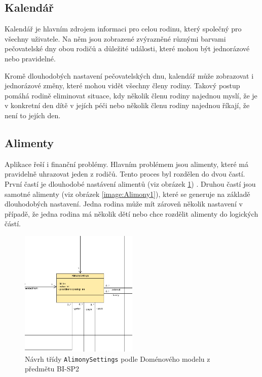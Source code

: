     \subsection{Kalendář}    
        Kalendář je hlavním zdrojem informaci pro celou rodinu, který společný pro všechny uživatele. Na něm jsou zobrazené zvýrazněné různými barvami pečovatelské dny obou rodičů a důležité události, které mohou být jednorázové nebo pravidelné. 
        
        Kromě dlouhodobých nastavení pečovatelských dnu, kalendář může zobrazovat i jednorázové změny, které mohou vidět všechny členy rodiny. Takový postup pomáhá rodině eliminovat situace, kdy několik členu rodiny najednou myslí, že je v konkretní den dítě v jejích péči nebo několik členu rodiny najednou říkají, že není to jejích den.  
    \subsection{Alimenty}    
        Aplikace řeší i finanční problémy. Hlavním problémem jsou alimenty, které má pravidelně uhrazovat jeden z rodičů. Tento proces byl rozdělen do dvou častí. První častí je dlouhodobé nastávení alimentů (viz obrázek \ref{image:AlimonySettings1}) . Druhou častí jsou samotné alimenty (viz obrázek \ref{image:Alimony1}), které se generuje na základě dlouhodobých nastavení. Jedna rodina může mít zároveň několik nastavení v případě, že jedna rodina má několik dětí nebo chce rozdělit alimenty do logických částí.
        \begin{figure}\centering
	        \includegraphics[width=0.5\textwidth]{pdfs/AlimonySettings1}
	        \caption[Návrh AlimonySettings]{Návrh třídy \texttt{AlimonySettings} podle Doménového modelu z předmětu BI-SP2}\label{image:AlimonySettings1}
        \end{figure}
